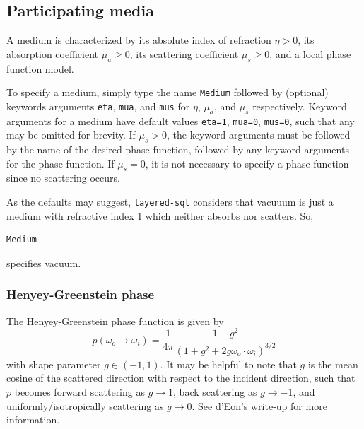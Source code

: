 \documentclass[
    twoside,
    twocolumn,
    letterpaper,
    10pt]{article}
\newcommand\namett[2]{{\color{code#1}\texttt{#2}}}
\begin{document}
\subsection{Participating media}
\label{sec:doc-media}

A medium is characterized by its 
absolute index of refraction $\eta > 0$, its absorption coefficient 
$\mu_a \ge 0 $, its scattering coefficient $\mu_s \ge 0$, and a local
phase function model.

To specify a medium, simply type the name \namett{blue}{Medium} followed
by (optional) keywords arguments \texttt{eta}, \texttt{mua}, and
\texttt{mus} for $\eta$, $\mu_a$, and $\mu_s$ respectively. Keyword 
arguments for a medium have default values \texttt{eta=1}, \texttt{mua=0}, 
\texttt{mus=0}, such that any may be omitted for brevity.
If $\mu_s > 0$, the keyword arguments must be followed by the name 
of the desired phase function, followed by any keyword arguments for the 
phase function. If $\mu_s = 0$, it is not necessary to specify a phase function
since no scattering occurs.

As the defaults may suggest, \texttt{layered-sqt} considers that vacuuum 
is just a medium with refractive index 1 which neither absorbs nor scatters. 
So,
\begin{lstlisting}
Medium
\end{lstlisting}
specifies vacuum. 

\subsubsection{Henyey-Greenstein phase}
\label{sec:doc-media-henyey-greenstein}

The Henyey-Greenstein phase function is given by 
\begin{equation*}
    p(\omega_o\to\omega_i) = 
    \frac{1}{4\pi}
    \frac{1-g^2}{(1+g^2+2g\omega_o\cdot\omega_i)^{3/2}}
\end{equation*}
with shape parameter $g\in(-1,1)$. It may be helpful to note 
that $g$ is the mean cosine of the scattered direction with respect to the 
incident direction, such that $p$ becomes forward scattering as $g\to1$, 
back scattering as $g\to-1$, and uniformly/isotropically scattering 
as $g\to0$. See d'Eon's write-up
\cite[p.~19]{dEon:16} for more information.
\end{document}
